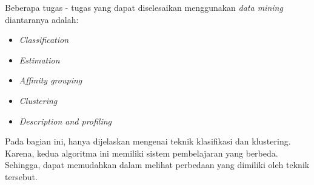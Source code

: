Beberapa tugas - tugas yang dapat diselesaikan menggunakan \textit{data mining} diantaranya adalah:

\begin{itemize}
	\item \textit{Classification}
	\item \textit{Estimation}
	\item \textit{Affinity grouping}
	\item \textit{Clustering}
	\item \textit{Description and profiling}
\end{itemize}

Pada bagian ini, hanya dijelaskan mengenai teknik klasifikasi dan klustering. Karena, kedua algoritma ini memiliki sistem pembelajaran yang berbeda. Sehingga, dapat memudahkan dalam melihat perbedaan yang dimiliki oleh teknik tersebut.

